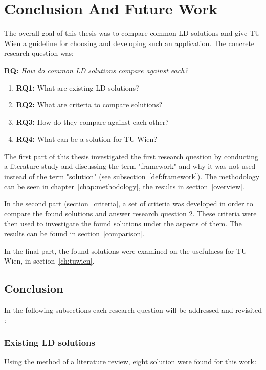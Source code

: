 \chapter{Conclusion And Future Work}\label{ch:summary}

The overall goal of this thesis was to compare common LD solutions and give TU Wien a guideline for choosing and developing such an application. The concrete research question was: 

\textbf{RQ:} \textit{How do common LD solutions compare against each?}
\begin{enumerate}
\item \textbf{RQ1:} What are existing LD solutions?
\item \textbf{RQ2:} What are criteria to compare solutions?
\item \textbf{RQ3:} How do they compare against each other?
\item \textbf{RQ4:} What can be a solution for TU Wien?
\end{enumerate}

The first part of this thesis investigated the first research question by conducting a literature study and discussing the term "framework" and why it was not used instead of the term "solution" (see subsection~\ref{def:framework}). The methodology can be seen in chapter~\ref{chap:methodology}, the results in section~\ref{overview}.

In the second part (section~\ref{criteria}, a set of criteria was developed in order to compare the found solutions and answer research question 2. These criteria were then used to investigate the found solutions under the aspects of them. The results can be found in section~\ref{comparison}.

In the final part, the found solutions were examined on the usefulness for TU Wien, in section~\ref{ch:tuwien}.  

\section{Conclusion}

In the following subsections each research question will be addressed and revisited :

\subsection{Existing LD solutions}

Using the method of a literature review, eight solution were found for this work: 

